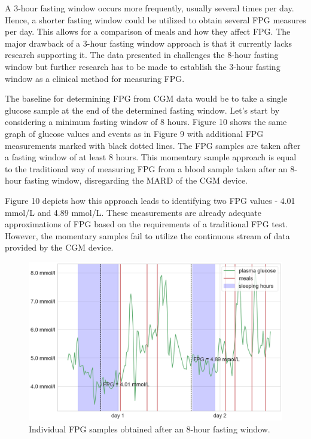 \documentclass[english, 12pt, a4paper, elec, utf8, a-1b, online]{aaltothesis}
\begin{document}
A 3-hour fasting window occurs more frequently, usually several times per day. Hence, a shorter fasting window could be utilized to obtain several FPG 
measures per day. This allows for a comparison of meals and how they affect FPG. The major drawback of a 3-hour fasting window approach is that it currently lacks
research supporting it. The data presented in \cite{moebus_impact_2011} challenges the 8-hour fasting window but further research has to be made
to establish the 3-hour fasting window as a clinical method for measuring FPG.

The baseline for determining FPG from CGM data would be to take a single glucose sample at the end of the determined fasting window. Let's start 
by considering a minimum fasting window of 8 hours\cite{mathew_blood_2022}. Figure 10 shows the same graph of glucose values 
and events as in Figure 9 with additional FPG measurements marked with black dotted lines. The FPG samples 
are taken after a fasting window of at least 8 hours. This momentary sample approach is equal to the traditional way of 
measuring FPG from a blood sample taken after an 8-hour fasting window, disregarding the MARD of the CGM device. 

Figure 10 depicts how this approach leads to identifying two FPG values - 4.01 mmol/L and 4.89 mmol/L. 
These measurements are already adequate approximations of FPG based on the requirements of a traditional FPG test\cite{mathew_blood_2022}.
However, the momentary samples fail to utilize the continuous stream of data provided by the CGM device.

\begin{figure}[H]
\centering
\includegraphics[width=14cm]{images/user_glucose_and_fpg1.png}
\caption{Individual FPG samples obtained after an 8-hour fasting window.}
\end{figure}
\end{document}
